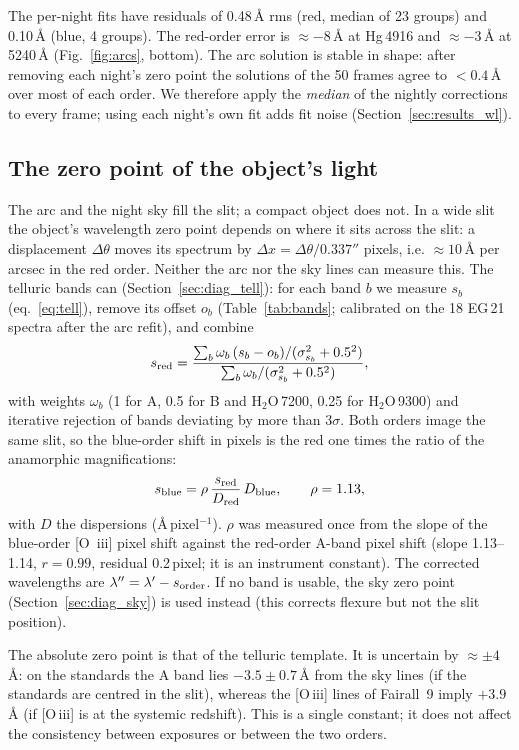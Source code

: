 The per-night fits have residuals of 0.48\,\AA{} rms (red, median of 23 groups) and 0.10\,\AA{} (blue, 4 groups).
The red-order error is $\approx-8$\,\AA{} at Hg\,4916 and $\approx-3$\,\AA{} at 5240\,\AA{}
(Fig.~\ref{fig:arcs}, bottom). The arc solution is stable in shape: after removing each night's zero point the
solutions of the 50 frames agree to $<0.4$\,\AA{} over most of each order. We therefore apply the \emph{median} of the
nightly corrections to every frame; using each night's own fit adds fit noise (Section~\ref{sec:results_wl}).

\subsection{The zero point of the object's light}
\label{sec:wl_zp}
The arc and the night sky fill the slit; a compact object does not. In a wide slit the object's wavelength zero
point depends on where it sits across the slit: a displacement $\Delta\theta$ moves its spectrum by
$\Delta x=\Delta\theta/0.337''$ pixels, i.e. $\approx10$\,\AA{} per arcsec in the red order. Neither the arc nor the
sky lines can measure this. The telluric bands can (Section~\ref{sec:diag_tell}): for each band $b$ we measure
$s_b$ (eq.~\ref{eq:tell}), remove its offset $o_b$ (Table~\ref{tab:bands}; calibrated on the 18 EG\,21 spectra after the
arc refit), and combine
\begin{equation}
s_{\rm red}=\frac{\sum_b \omega_b\,(s_b-o_b)/(\sigma_{s_b}^2+0.5^2)}{\sum_b \omega_b/(\sigma_{s_b}^2+0.5^2)},
\label{eq:tellcomb}
\end{equation}
with weights $\omega_b$ (1 for A, 0.5 for B and H$_2$O\,7200, 0.25 for H$_2$O\,9300) and iterative rejection of
bands deviating by more than $3\sigma$. Both orders image the same slit, so the blue-order shift in pixels is the red
one times the ratio of the anamorphic magnifications:
\begin{equation}
s_{\rm blue} = \rho\,\frac{s_{\rm red}}{D_{\rm red}}\,D_{\rm blue},\qquad \rho=1.13,
\label{eq:transfer}
\end{equation}
with $D$ the dispersions (\AA\,pixel$^{-1}$). $\rho$ was measured once from the slope of the blue-order [O\,{\sc
iii}] pixel shift against the red-order A-band pixel shift (slope 1.13--1.14, $r=0.99$, residual 0.2\,pixel; it is
an instrument constant). The corrected wavelengths are $\lambda''=\lambda'-s_{\rm order}$. If no band is usable, the
sky zero point (Section~\ref{sec:diag_sky}) is used instead (this corrects flexure but not the slit position).

The absolute zero point is that of the telluric template. It is uncertain by $\approx\pm4$\,\AA{}: on the
standards the A band lies $-3.5\pm0.7$\,\AA{} from the sky lines (if the standards are centred in the slit), whereas
the [O\,{\sc iii}] lines of Fairall~9 imply $+3.9$\,\AA{} (if [O\,{\sc iii}] is at the systemic redshift). This is a
single constant; it does not affect the consistency between exposures or between the two orders.
